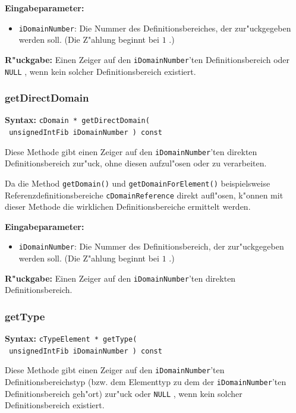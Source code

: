 \bigskip\noindent
\textbf{Eingabeparameter:}
\begin{itemize}
 \item \verb|iDomainNumber|: Die Nummer des Definitionsbereiches, der zur"uckgegeben werden soll. (Die Z"ahlung beginnt bei $1$ .)
\end{itemize}

\bigskip\noindent
\textbf{R"uckgabe:} Einen Zeiger auf den \verb|iDomainNumber|'ten Definitionsbereich oder \verb|NULL| , wenn kein solcher Definitionsbereich existiert.


\subsubsection{getDirectDomain}

\textbf{Syntax:} \verb|cDomain * getDirectDomain(| \\\verb| unsignedIntFib iDomainNumber ) const|

\bigskip\noindent
Diese Methode gibt einen Zeiger auf den \verb|iDomainNumber|'ten direkten Definitionsbereich zur"uck, ohne diesen aufzul"osen oder zu verarbeiten.

Da die Method \verb|getDomain()| und \verb|getDomainForElement()| beispielsweise Referenzdefinitionsbereiche \verb|cDomainReference| direkt aufl"osen, k"onnen mit dieser Methode die wirklichen Definitionsbereiche ermittelt werden.

\bigskip\noindent
\textbf{Eingabeparameter:}
\begin{itemize}
 \item \verb|iDomainNumber|: Die Nummer des Definitionsbereich, der zur"uckgegeben werden soll. (Die Z"ahlung beginnt bei $1$ .)
\end{itemize}

\bigskip\noindent
\textbf{R"uckgabe:} Einen Zeiger auf den \verb|iDomainNumber|'ten direkten Definitionsbereich.


\subsubsection{getType}

\textbf{Syntax:} \verb|cTypeElement * getType(| \\\verb| unsignedIntFib iDomainNumber ) const|

\bigskip\noindent
Diese Methode gibt einen Zeiger auf den \verb|iDomainNumber|'ten Definitionsbereichstyp (bzw. dem Elementtyp zu dem der \verb|iDomainNumber|'ten Definitionsbereich geh"ort) zur"uck oder \verb|NULL| , wenn kein solcher Definitionsbereich existiert.

